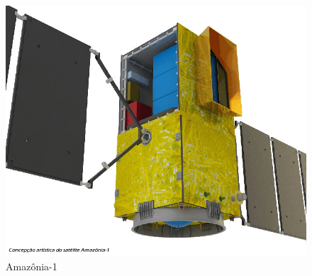 \begin{figure}[!htb]
    \begin{minipage}{0.5\textwidth}
        \centering
        \includegraphics[width=0.7\linewidth]{./figuras/Amazonia-1}
        \caption{Amaz\^onia-1}
        \label{fig:amazonia}
    \end{minipage}
\end{figure}